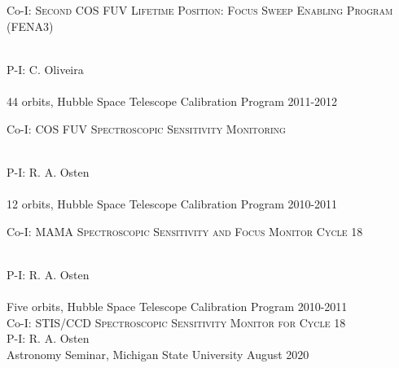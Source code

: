 \documentclass[10pt]{cv}
\begin{document}
\begin{llist}
\begin{minipage}[l]{0.7\textwidth}
Co-I: \textsc{Second COS FUV Lifetime Position: Focus Sweep Enabling Program (FENA3)} 
\end{minipage}\vspace{0.15cm}\\
P-I: C. Oliveira \\%
\\
44 orbits, Hubble Space Telescope Calibration Program \hfill 2011-2012\\ %
\begin{minipage}[l]{0.7\textwidth}\vspace{0.15cm}
Co-I: \textsc{COS FUV Spectroscopic Sensitivity Monitoring} 
\end{minipage}\vspace{0.15cm}\\
P-I: R. A. Osten\\%
\\
12 orbits, Hubble Space Telescope Calibration Program \hfill 2010-2011\\ %
\begin{minipage}[l]{0.7\textwidth}\vspace{0.15cm}
Co-I: \textsc{MAMA Spectroscopic Sensitivity and Focus Monitor Cycle 18} \\
\end{minipage}\vspace{0.15cm}\\
P-I: R. A. Osten \\%
\\
Five orbits, Hubble Space Telescope Calibration Program \hfill 2010-2011\\ %
Co-I: \textsc{STIS/CCD Spectroscopic Sensitivity Monitor for Cycle 18} \\
P-I: R. A. Osten\\%
\vspace{-0.1in}  
Astronomy Seminar, Michigan State University \hfill August 2020 \\%
\\

\end{llist}
\end{document}
